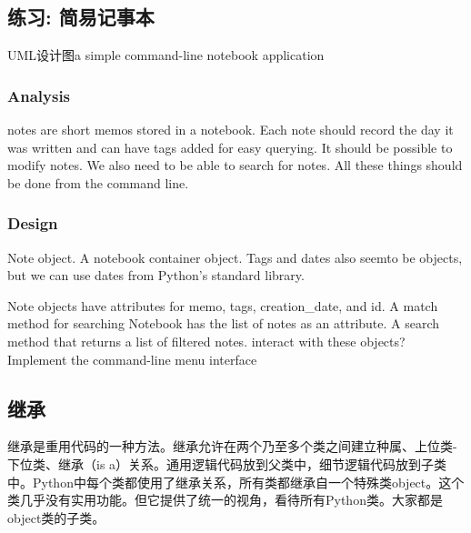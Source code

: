\subsection{练习: 简易记事本}
UML设计图a simple command-line notebook application
\subsubsection{Analysis}
notes are short memos stored in a notebook.  Each note should record
the day it was written and can have tags added for easy querying.  It
should be possible to modify notes.  We also need to be able to search
for notes.  All these things should be done from the command line.
\subsubsection{Design}

Note object.  A notebook container object.  Tags and dates also seemto
be objects, but we can use dates from Python's standard library.

Note objects have attributes for memo, tags, creation\_date, and id.  A
match method for searching Notebook has the list of notes as an
attribute.  A search method that returns a list of filtered notes.
interact with these objects? Implement the command-line menu interface

\subsection{继承}
继承是重用代码的一种方法。继承允许在两个乃至多个类之间建立种属、上位类-下位类、继承（is a）关系。通用逻辑代码放到父类中，细节逻辑代码放到子类中。Python中每个类都使用了继承关系，所有类都继承自一个特殊类object。这个类几乎没有实用功能。但它提供了统一的视角，看待所有Python类。大家都是object类的子类。


